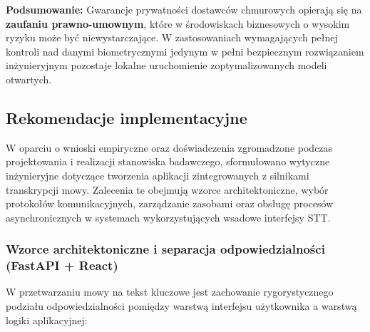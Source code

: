 \textbf{Podsumowanie:} Gwarancje prywatności dostawców chmurowych opierają się na \textbf{zaufaniu prawno-umownym}, które w środowiskach biznesowych o wysokim ryzyku może być niewystarczające. W zastosowaniach wymagających pełnej kontroli nad danymi biometrycznymi jedynym w pełni bezpiecznym rozwiązaniem inżynieryjnym pozostaje lokalne uruchomienie zoptymalizowanych modeli otwartych.


\subsection{Rekomendacje implementacyjne}
\label{subsec:implementation_recommendations}

W oparciu o wnioski empiryczne oraz doświadczenia zgromadzone podczas projektowania i realizacji stanowiska badawczego, sformułowano wytyczne inżynieryjne dotyczące tworzenia aplikacji zintegrowanych z silnikami transkrypcji mowy. Zalecenia te obejmują wzorce architektoniczne, wybór protokołów komunikacyjnych, zarządzanie zasobami oraz obsługę procesów asynchronicznych w systemach wykorzystujących wsadowe interfejsy STT.

\subsubsection{Wzorce architektoniczne i separacja odpowiedzialności (FastAPI + React)}

W przetwarzaniu mowy na tekst kluczowe jest zachowanie rygorystycznego podziału odpowiedzialności pomiędzy warstwą interfejsu użytkownika a warstwą logiki aplikacyjnej:

